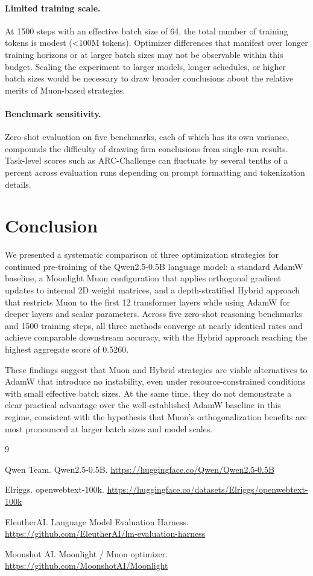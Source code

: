 \documentclass[11pt,a4paper]{article}
\begin{document}
\paragraph{Limited training scale.}
At 1500 steps with an effective batch size of 64, the
total number of training tokens is modest (<100M tokens). Optimizer differences that manifest
over longer training horizons or at larger batch sizes may not be observable
within this budget. Scaling the experiment to larger models, longer schedules,
or higher batch sizes would be necessary to draw broader conclusions about the
relative merits of Muon-based strategies.

\paragraph{Benchmark sensitivity.}
Zero-shot evaluation on five benchmarks, each of which
has its own variance, compounds the difficulty of drawing firm conclusions
from single-run results. Task-level scores such as ARC-Challenge can fluctuate
by several tenths of a percent across evaluation runs depending on prompt
formatting and tokenization details.


\section{Conclusion}

We presented a systematic comparison of three optimization strategies for
continued pre-training of the Qwen2.5-0.5B language model: a standard AdamW
baseline, a Moonlight Muon configuration that applies orthogonal gradient updates
to internal 2D weight matrices, and a depth-stratified Hybrid approach that
restricts Muon to the first 12 transformer layers while using AdamW for deeper
layers and scalar parameters. Across five zero-shot reasoning benchmarks and 1500
training steps, all three methods converge at nearly identical rates and achieve
comparable downstream accuracy, with the Hybrid approach reaching the highest
aggregate score of 0.5260.

These findings suggest that Muon and Hybrid strategies are viable alternatives
to AdamW that introduce no instability, even under resource-constrained conditions
with small effective batch sizes. At the same time, they do not demonstrate a
clear practical advantage over the well-established AdamW baseline in this regime,
consistent with the hypothesis that Muon's orthogonalization benefits are most
pronounced at larger batch sizes and model scales.

\begin{thebibliography}{9}

	Qwen Team. Qwen2.5-0.5B.
	\url{https://huggingface.co/Qwen/Qwen2.5-0.5B}

	Elriggs. openwebtext-100k. \url{https://huggingface.co/datasets/Elriggs/openwebtext-100k}

	EleutherAI. Language Model Evaluation Harness.
	\url{https://github.com/EleutherAI/lm-evaluation-harness}

	Moonshot AI. Moonlight / Muon optimizer.
	\url{https://github.com/MoonshotAI/Moonlight}

\end{thebibliography}
\end{document}

